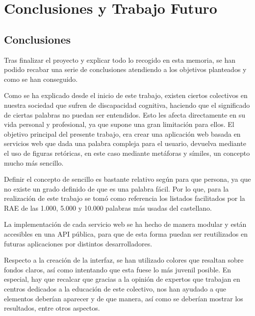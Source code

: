 \chapter{Conclusiones y Trabajo Futuro}
\label{cap:conclusionesyFuturo}

 

\section{Conclusiones}
\label{cap:sec:conclusiones}

Tras finalizar el proyecto y explicar todo lo recogido en esta memoria, se han podido recabar una serie de conclusiones atendiendo a los objetivos planteados y como se han conseguido.

Como se ha explicado desde el inicio de este trabajo, existen ciertos colectivos en nuestra sociedad que sufren de discapacidad cognitiva, haciendo que el significado de ciertas palabras no puedan ser entendidos. Esto les afecta directamente en su vida personal y profesional, ya que supone una gran limitación para ellos.
El objetivo principal del presente trabajo, era crear una aplicación web basada en servicios web que dada una palabra compleja para el usuario, devuelva mediante el uso de figuras retóricas, en este caso mediante metáforas y símiles, un concepto mucho más sencillo.

Definir el concepto de sencillo es bastante relativo según para que persona, ya que no existe un grado definido de que es una palabra fácil. Por lo que, para la realización de este trabajo se tomó como referencia los listados facilitados por la RAE de las 1.000, 5.000 y 10.000 palabras más usadas del castellano.

La implementación de cada servicio web se ha hecho de manera modular y están accesibles en una API pública, para que de esta forma puedan ser reutilizados en futuras aplicaciones por distintos desarrolladores.

 Respecto a la creación de la interfaz, se han utilizado colores que resaltan sobre fondos claros, así como intentando que esta fuese lo más juvenil posible.
 En especial, hay que recalcar que gracias a la opinión de expertos que trabajan en centros dedicados a la educación de este colectivo, nos han ayudado a que elementos deberían aparecer y de que manera, así como se deberían mostrar los resultados, entre otros aspectos. 

